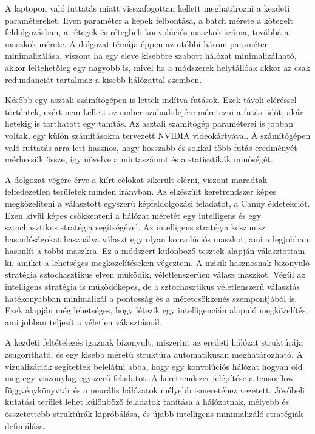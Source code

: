 \documentclass[12pt]{report}
\begin{document}
A laptopon való futtatás miatt visszafogottan kellett meghatározni a kezdeti paramétereket. Ilyen paraméter a képek felbontása, a batch mérete a kötegelt feldolgozásban, a rétegek és rétegbeli konvolúciós maszkok száma, továbbá a maszkok mérete. A dolgozat témája éppen az utóbbi három paraméter minimalizálása, viszont ha egy eleve kisebbre szabott hálózat minimalizálható, akkor feltehetőleg egy nagyobb is, mivel ha a módszerek helytállóak akkor az csak redundanciát tartalmaz a kisebb hálózattal szemben.

Később egy asztali számítógépen is lettek indítva futások. Ezek távoli eléréssel történtek, ezért nem kellett az ember szabadidejére méretezni a futási időt, akár hetekig is tarthatott egy tanítás. Az asztali számítógép paraméterei is jobban voltak, egy külön számításokra tervezett NVIDIA videokártyával. A számítógépen való futtatás arra lett hasznos, hogy hosszabb és sokkal több futás eredményét mérhessük össze, így növelve a mintaszámot és a statisztikák minőségét.

A dolgozat végére érve a kiírt célokat sikerült elérni, viszont maradtak felfedezetlen területek minden irányban. Az elkészült keretrendszer képes megközelíteni a választott egyszerű képfeldolgozási feladatot, a Canny éldetekciót. Ezen kívül képes csökkenteni a hálózat méretét egy intelligens és egy sztochasztikus stratégia segítségével. Az intelligens stratégia koszinusz hasonlóságokat használva választ egy olyan konvolúciós maszkot, ami a legjobban hasonlít a többi maszkra. Ez a módszert különböző tesztek alapján választottam ki, amiket a lehetséges megközelítéseken végeztem. A másik hasznosnak bizonyuló stratégia sztochasztikus elven működik, véletlenszerűen válasz maszkot. Végül az intelligens stratégia is működőképes, de a sztochasztikus véletlenszerű választás hatékonyabban minimalizál a pontosság és a méretcsökkenés szempontjából is. Ezek alapján még lehetséges, hogy létezik egy intelligencián alapuló megközelítés, ami jobban teljesít a véletlen választásnál.

A kezdeti feltételezés igaznak bizonyult, miszerint az eredeti hálózat struktúrája zsugorítható, és egy kisebb méretű struktúra automatikusan meghatározható. A vizualizációk segítettek belelátni abba, hogy egy konvolúciós hálózat hogyan old meg egy viszonylag egyszerű feladatot. A keretrendszer felépítése a tensorflow függvénykönyvtár és a neurális hálózatok mélyebb ismeretéhez vezetett. Jövőbeli kutatási terület lehet különböző feladatok tanítása a hálózatnak, mélyebb és összetettebb struktúrák kipróbálása, és újabb intelligens minimalizáló stratégiák definiálása.
\end{document}
